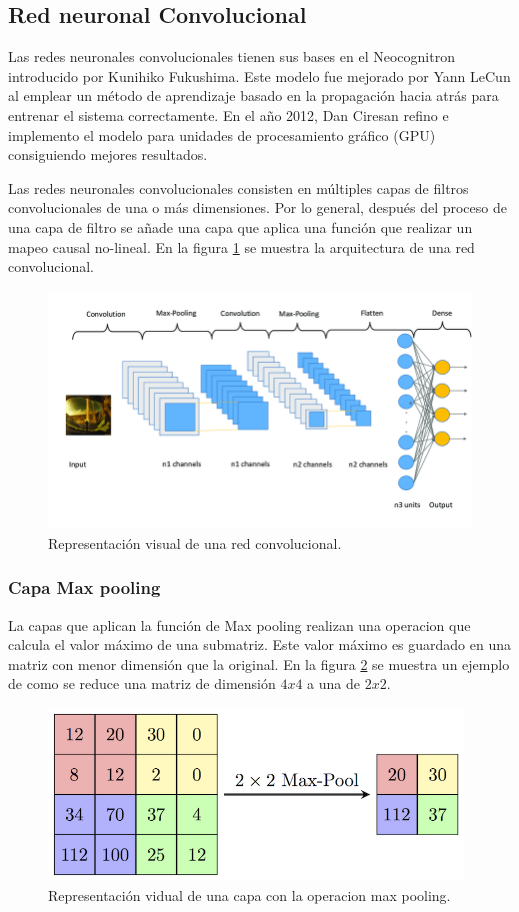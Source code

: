 \subsection{Red neuronal Convolucional}

Las redes neuronales convolucionales tienen sus bases en el Neocognitron introducido por  Kunihiko Fukushima\cite{Fukushima_1980}. Este modelo fue mejorado por Yann LeCun\cite{Lecun_1998} al emplear un método de aprendizaje basado en la propagación hacia atrás para entrenar el sistema correctamente. En el año 2012, Dan Ciresan refino e implemento el modelo para unidades de procesamiento gráfico (GPU) consiguiendo mejores resultados\cite{Cirecsan_2011}.

Las redes neuronales convolucionales consisten en múltiples capas de filtros convolucionales de una o más dimensiones. Por lo general, después del proceso de una capa de filtro se añade una capa que aplica una función que realizar un mapeo causal no-lineal. En la figura \ref{fig:CNN} se muestra la arquitectura de una red convolucional.

\begin{figure}[H]
    \centering
    \includegraphics[width=15cm]{Graphics/convolutional.png}
    \caption{Representación visual de una red convolucional\cite{Garcia_2020}.}
    \label{fig:CNN}
\end{figure}

\subsubsection{Capa Max pooling}

La capas que aplican la función de Max pooling realizan una operacion que calcula el valor máximo de una submatriz. Este valor máximo es guardado en una matriz con menor dimensión que la original. En la figura \ref{fig:max_pooling} se muestra un ejemplo de como se reduce una matriz de dimensión $4x4$ a una de $2x2$.

\begin{figure}[H]
    \centering
    \includegraphics[width=11cm]{Graphics/max_pooling.png}
    \caption{Representación vidual de una capa con la operacion max pooling.}
    \label{fig:max_pooling}
\end{figure}